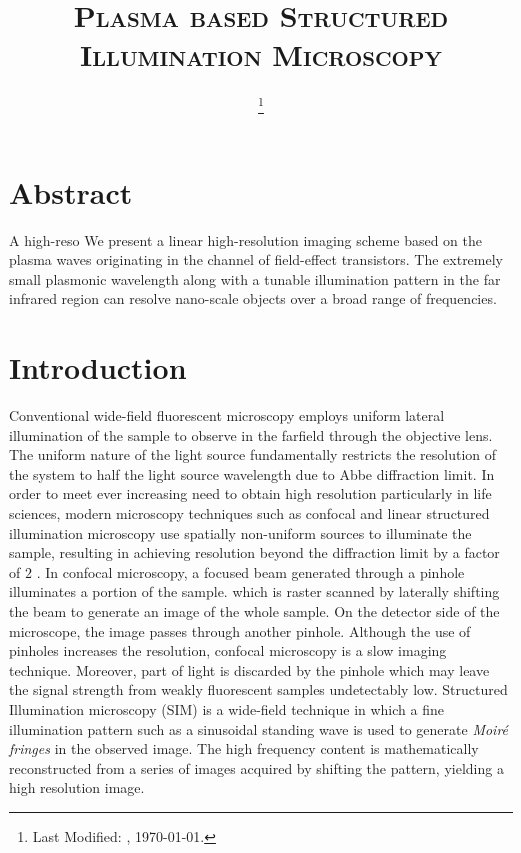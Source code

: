\documentclass[11pt]{article}
\begin{document}
\title{\textsc{Plasma based Structured Illumination Microscopy}\\}
\date{\footnote{Last Modified: \currenttime, \today.}}
\maketitle


\section{Abstract}
%
A high-reso
We present a linear high-resolution imaging scheme based on the plasma waves originating in the channel of field-effect transistors. The extremely small plasmonic wavelength along with a tunable illumination pattern in the far infrared region can resolve nano-scale objects over a broad range of frequencies.
%
\section{Introduction}
%
Conventional wide-field fluorescent microscopy employs uniform lateral illumination of the sample to observe in the farfield through the objective lens. The uniform nature of the light source fundamentally restricts the resolution of the system to half the light source wavelength due to Abbe diffraction limit. In order to meet ever increasing need to obtain high resolution particularly in life sciences, modern microscopy techniques such as confocal and linear structured illumination microscopy use spatially non-uniform sources to illuminate the sample, resulting in achieving resolution beyond the diffraction limit by a factor of $2$ \cite{Minsky_1988,Gustafsson_2005}. In confocal microscopy, a focused beam generated through a pinhole illuminates a portion of the sample. which is raster scanned by laterally shifting the beam to generate an image of the whole sample. On the detector side of the microscope, the image passes through another pinhole. Although the use of pinholes increases the resolution, confocal microscopy is a slow imaging technique. Moreover, part of light is discarded by the pinhole which may leave the signal strength from weakly fluorescent samples undetectably low. Structured Illumination microscopy (SIM) is a wide-field technique in which a fine illumination pattern such as a sinusoidal standing wave is used to generate \emph{Moiré fringes} in the observed image. The high frequency content is mathematically reconstructed from a series of images acquired by shifting the pattern, yielding a high resolution image.
\end{document}
